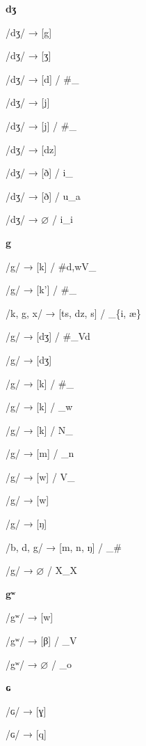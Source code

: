 \begin{center}\textbf{dʒ}\end{center}
\begin{multicols}{4}
\noindent /dʒ/ → [g]

\noindent /dʒ/ → [ʒ]

\noindent /dʒ/ → [d] / \#\_

\noindent /dʒ/ → [j]

\noindent /dʒ/ → [j] / \#\_

\noindent /dʒ/ → [dz]

\noindent /dʒ/ → [ð] / i\_

\noindent /dʒ/ → [ð] / u\_a

\noindent /dʒ/ → $\varnothing$ / i\_i

\end{multicols}

\begin{center}\textbf{g}\end{center}
\begin{multicols}{4}
\noindent /g/ → [k] / \#{d,w}V\_

\noindent /g/ → [k'] / \#\_

\noindent /k, g, x/ → [ts, dz, s] / \_\{i, æ\}

\noindent /g/ → [dʒ] / \#\_Vd

\noindent /g/ → [dʒ]

\noindent /g/ → [k] / \#\_

\noindent /g/ → [k] / \_w

\noindent /g/ → [k] / N\_

\noindent /g/ → [m] / \_n

\noindent /g/ → [w] / V\_

\noindent /g/ → [w]

\noindent /g/ → [ŋ]

\noindent /b, d, g/ → [m, n, ŋ] / \_\#

\noindent /g/ → $\varnothing$ / X\_X
\end{multicols}


\begin{center}\textbf{gʷ}\end{center}
\begin{multicols}{4}
\noindent /gʷ/ → [w]

\noindent /gʷ/ → [β] / \_V

\noindent /gʷ/ → $\varnothing$ / \_o

\end{multicols}


\begin{center}\textbf{ɢ}\end{center}
\begin{multicols}{4}
\noindent /ɢ/ → [ɣ]

\noindent /ɢ/ → [q]
\end{multicols}


